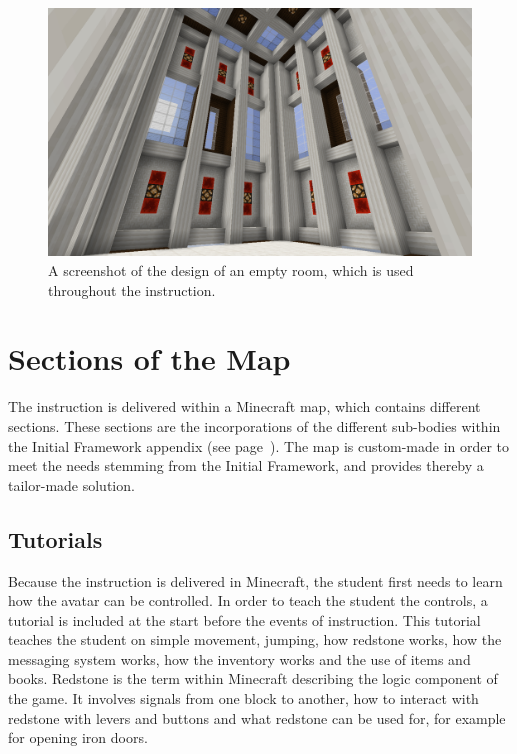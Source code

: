 \documentclass[11pt,twoside]{report} %
\begin{document}
\begin{figure}[h]
\centering
\includegraphics[width=\textwidth]{roomdesign}
\caption{A screenshot of the design of an empty room, which is used throughout the instruction.\label{fig:roomdesign}}
\end{figure}

\section{Sections of the Map}

The instruction is delivered within a Minecraft map, which contains different sections. These sections are the incorporations of the different sub-bodies within the Initial Framework appendix (see page~\pageref{framework1}). The map is custom-made in order to meet the needs stemming from the Initial Framework, and provides thereby a tailor-made solution.

\subsection{Tutorials}

Because the instruction is delivered in Minecraft, the student first needs to learn how the avatar can be controlled. In order to teach the student the controls, a tutorial is included at the start before the events of instruction. This tutorial teaches the student on simple movement, jumping, how redstone works, how the messaging system works, how the inventory works and the use of items and books. Redstone is the term within Minecraft describing the logic component of the game. It involves signals from one block to another, how to interact with redstone with levers and buttons and what redstone can be used for, for example for opening iron doors.
\end{document}
